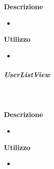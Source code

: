 				\textbf{\\ \\ Descrizione} 
					\begin{itemize}
						\item[] 
					\end{itemize}      
				\textbf{Utilizzo}  
					\begin{itemize}
						\item[] 
					\end{itemize}
			\subparagraph{UserListView}
				
				\textbf{\\ \\ Descrizione} 
					\begin{itemize}
						\item[] 
					\end{itemize}      
				\textbf{Utilizzo}  
					\begin{itemize}
						\item[] 
					\end{itemize}